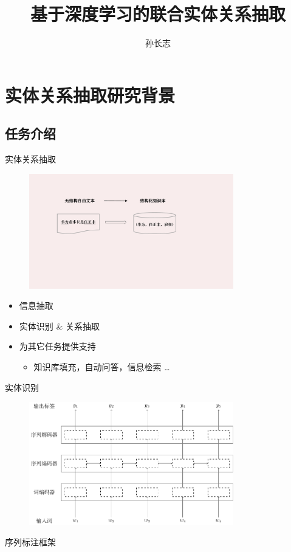 \documentclass{beamer}
\title[基于深度学习的联合实体关系抽取]{基于深度学习的联合实体关系抽取}
\author[ChangzhiSun]{孙长志}
\begin{document}
	\typesetFrontSlides


\section{实体关系抽取研究背景}
\subsection*{任务介绍}
\begin{frame}{实体关系抽取}

    \begin{figure}[t]
        \begin{center}
            \includegraphics[width=3.5in]{images/task}
        \end{center}
    \end{figure}

	\begin{itemize}
        \item 信息抽取
		\item 实体识别 \& 关系抽取
        \item 为其它任务提供支持
            \begin{itemize}
                \item 知识库填充，自动问答，信息检索 \dots
            \end{itemize}
	\end{itemize}
\end{frame}

\begin{frame}{实体识别}
    \begin{figure}[h]
        \begin{center}
            \includegraphics[width=3.5in]{images/seq-label}
        \end{center}
    \end{figure}
    \begin{center}
        序列标注框架
    \end{center}

\end{frame}
\end{document}
